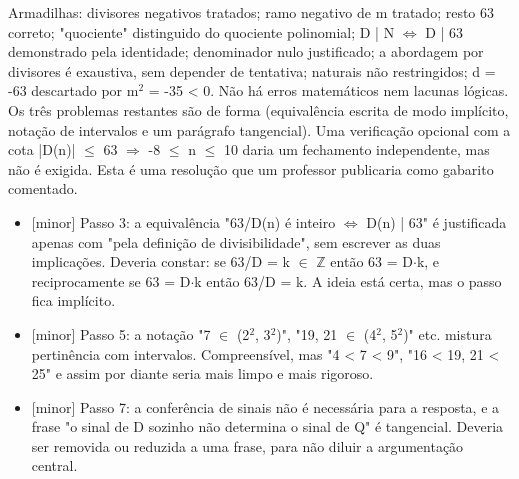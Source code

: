 \documentclass{article}%
\begin{document}
\newline%
Armadilhas: divisores negativos tratados; ramo negativo de m tratado; resto 63 correto; "quociente" distinguido do quociente polinomial; D | N $\Leftrightarrow$ D | 63 demonstrado pela identidade; denominador nulo justificado; a abordagem por divisores é exaustiva, sem depender de tentativa; naturais não restringidos; d = -63 descartado por m$^2$ = -35 < 0.\newline%
\newline%
Não há erros matemáticos nem lacunas lógicas. Os três problemas restantes são de forma (equivalência escrita de modo implícito, notação de intervalos e um parágrafo tangencial). Uma verificação opcional com a cota |D(n)| $\leq$ 63 $\Rightarrow$ -8 $\leq$ n $\leq$ 10 daria um fechamento independente, mas não é exigida. Esta é uma resolução que um professor publicaria como gabarito comentado.%
\begin{itemize}%
\item%
{[}minor{]} Passo 3: a equivalência "63/D(n) é inteiro $\Leftrightarrow$ D(n) | 63" é justificada apenas com "pela definição de divisibilidade", sem escrever as duas implicações. Deveria constar: se 63/D = k $\in$ $\mathbb{Z}$ então 63 = D$\cdot$k, e reciprocamente se 63 = D$\cdot$k então 63/D = k. A ideia está certa, mas o passo fica implícito.%
\item%
{[}minor{]} Passo 5: a notação "7 $\in$ (2$^2$, 3$^2$)", "19, 21 $\in$ (4$^2$, 5$^2$)" etc. mistura pertinência com intervalos. Compreensível, mas "4 < 7 < 9", "16 < 19, 21 < 25" e assim por diante seria mais limpo e mais rigoroso.%
\item%
{[}minor{]} Passo 7: a conferência de sinais não é necessária para a resposta, e a frase "o sinal de D sozinho não determina o sinal de Q" é tangencial. Deveria ser removida ou reduzida a uma frase, para não diluir a argumentação central.%
\end{itemize}%
\end{document}
